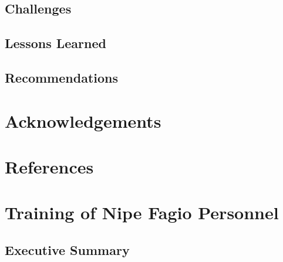 \documentclass[a4paper,12pt,twoside]{article}
\begin{document}
\begin{multicols}{2}
\lipsum[0-5]
\end{multicols}

\subsection{Challenges}

\begin{multicols}{2}
\lipsum[0-5]
\end{multicols}

\subsection{Lessons Learned}

\begin{multicols}{2}
\lipsum[0-5]
\end{multicols}
\subsection{Recommendations}

\begin{multicols}{2}
\lipsum[0-5]
\end{multicols}

\section{Acknowledgements}

\begin{multicols}{2}
\lipsum[0-5]
\end{multicols}

\section{References}

\begin{multicols}{2}
\lipsum[0-5]
\end{multicols}

\section{Training of Nipe Fagio Personnel}

\begin{multicols}{2}
\lipsum[0-5]
\end{multicols}

\subsection{Executive Summary}
\end{document}
